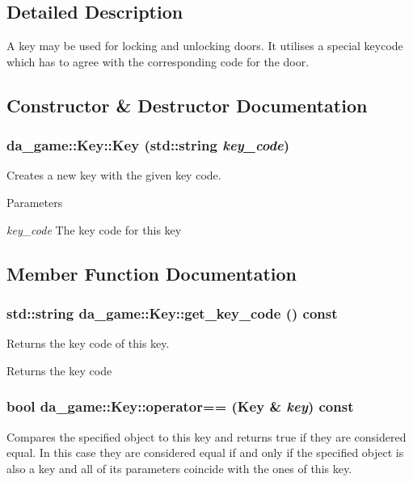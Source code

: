 \subsection{Detailed Description}
A key may be used for locking and unlocking doors. It utilises a special keycode which has to agree with the corresponding code for the door. 

\subsection{Constructor \& Destructor Documentation}
\hypertarget{classda__game_1_1Key_a15fcc235eb6d5c76e574fd02ab9bad4b}{
\subsubsection[{Key}]{\setlength{\rightskip}{0pt plus 5cm}da\_\-game::Key::Key (std::string {\em key\_\-code})}}
\label{classda__game_1_1Key_a15fcc235eb6d5c76e574fd02ab9bad4b}
Creates a new key with the given key code.


\begin{DoxyParams}{Parameters}
\item[{\em key\_\-code}]The key code for this key \end{DoxyParams}


\subsection{Member Function Documentation}
\hypertarget{classda__game_1_1Key_a1d96d265ce05db8566dfd62615de61c6}{
\subsubsection[{get\_\-key\_\-code}]{\setlength{\rightskip}{0pt plus 5cm}std::string da\_\-game::Key::get\_\-key\_\-code () const}}
\label{classda__game_1_1Key_a1d96d265ce05db8566dfd62615de61c6}
Returns the key code of this key.

\begin{DoxyReturn}{Returns}
the key code 
\end{DoxyReturn}
\hypertarget{classda__game_1_1Key_af3b5c0256dfcfc935e898d27dd47ffeb}{
\subsubsection[{operator==}]{\setlength{\rightskip}{0pt plus 5cm}bool da\_\-game::Key::operator== ({\bf Key} \& {\em key}) const}}
\label{classda__game_1_1Key_af3b5c0256dfcfc935e898d27dd47ffeb}
Compares the specified object to this key and returns true if they are considered equal. In this case they are considered equal if and only if the specified object is also a key and all of its parameters coincide with the ones of this key.

